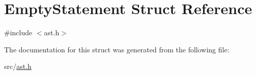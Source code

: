 \hypertarget{struct_empty_statement}{}\section{Empty\+Statement Struct Reference}
\label{struct_empty_statement}


{\ttfamily \#include $<$ast.\+h$>$}



The documentation for this struct was generated from the following file\+:\begin{DoxyCompactItemize}
\item 
src/\hyperlink{ast_8h}{ast.\+h}\end{DoxyCompactItemize}

